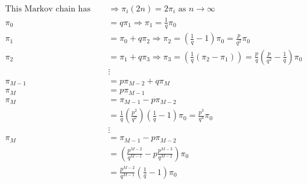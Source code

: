 \documentclass[answers]{exam}
\begin{document}
\begin{questions}
\begin{solution}
        \begin{align*}
            \text{This Markov chain has period 2} & \Rightarrow \pi_{i}(2n) = 2\pi_{i} \text{ as } n \rightarrow \infty                                                                                   \\
            \pi_{0}                               & = q\pi_{1} \Rightarrow \pi_{1} = \frac{1}{q}\pi_{0}                                                                                                   \\
            \pi_{1}                               & = \pi_{0} + q\pi_{2} \Rightarrow \pi_{2} = \left(\frac{1}{q} - 1\right)\pi_{0} = \frac{p}{q^{2}}\pi_{0}                                               \\
            \pi_{2}                               & = \pi_{1} + q\pi_{3} \Rightarrow \pi_{3} = \left(\frac{1}{q}(\pi_{2} - \pi_{1})\right) = \frac{p}{q}\left(\frac{p}{q^{2}} - \frac{1}{q}\right)\pi_{0} \\
                                                  & \vdots                                                                                                                                                \\
            \pi_{M-1}                             & = p\pi_{M-2} + q\pi_{M}                                                                                                                               \\
            \pi_{M}                               & = p\pi_{M-1}                                                                                                                                          \\
            \pi_{M}                               & = \pi_{M-1} - p\pi_{M-2}                                                                                                                              \\
                                                  & = \frac{1}{q}\left(\frac{p^{2}}{q^{2}}\right) \left(\frac{1}{q} - 1\right)\pi_{0} = \frac{p^{3}}{q^{4}}\pi_{0}                                      \\
                                                  & \vdots                                                                                                                                                \\
            \pi_{M}                               & = \pi_{M-1} - p\pi_{M-2}                                                                                                                              \\
                                                  & = \left(\frac{p^{M-2}}{q^{M-1}} - p\frac{p^{M-3}}{q^{M-2}}\right)\pi_{0} \\
                                                  & = \frac{p^{M-2}}{q^{M-1}}\left(\frac{1}{q} - 1\right)\pi_{0} \\
        \end{align*}

    \end{solution}
\end{questions}
\end{document}
